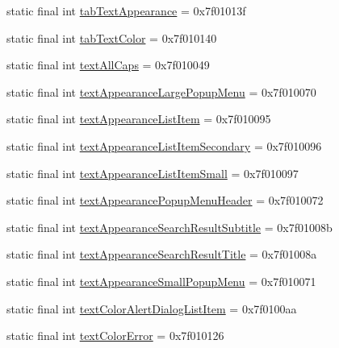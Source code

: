 \begin{CompactItemize}
\item 
static final int \hyperlink{classandroid_1_1support_1_1coreutils_1_1_r_1_1attr_c15cf96834741bc42b41baaee0ecf40f}{tabTextAppearance} = 0x7f01013f
\item 
static final int \hyperlink{classandroid_1_1support_1_1coreutils_1_1_r_1_1attr_e9d3c152066389e8ec541049ad937762}{tabTextColor} = 0x7f010140
\item 
static final int \hyperlink{classandroid_1_1support_1_1coreutils_1_1_r_1_1attr_b7b1c8a0c971e6901b2221500092f4fc}{textAllCaps} = 0x7f010049
\item 
static final int \hyperlink{classandroid_1_1support_1_1coreutils_1_1_r_1_1attr_e0037c83ef07e0b93a2fadab5cb1f950}{textAppearanceLargePopupMenu} = 0x7f010070
\item 
static final int \hyperlink{classandroid_1_1support_1_1coreutils_1_1_r_1_1attr_ad1107b3e7e49f66905d300eafcbb47b}{textAppearanceListItem} = 0x7f010095
\item 
static final int \hyperlink{classandroid_1_1support_1_1coreutils_1_1_r_1_1attr_c2f04fb74c8792d73022935e83b62a57}{textAppearanceListItemSecondary} = 0x7f010096
\item 
static final int \hyperlink{classandroid_1_1support_1_1coreutils_1_1_r_1_1attr_13828f83a04e4eef190a9d7f09523194}{textAppearanceListItemSmall} = 0x7f010097
\item 
static final int \hyperlink{classandroid_1_1support_1_1coreutils_1_1_r_1_1attr_453dfd9c527becd2d4d5d71c92fd1997}{textAppearancePopupMenuHeader} = 0x7f010072
\item 
static final int \hyperlink{classandroid_1_1support_1_1coreutils_1_1_r_1_1attr_dd92587e1790df831aa81efe9cac7042}{textAppearanceSearchResultSubtitle} = 0x7f01008b
\item 
static final int \hyperlink{classandroid_1_1support_1_1coreutils_1_1_r_1_1attr_f8b8bc98235454f72f5c3c0c41fdabc6}{textAppearanceSearchResultTitle} = 0x7f01008a
\item 
static final int \hyperlink{classandroid_1_1support_1_1coreutils_1_1_r_1_1attr_b4a699bec30848bfb8ea27008e4ac839}{textAppearanceSmallPopupMenu} = 0x7f010071
\item 
static final int \hyperlink{classandroid_1_1support_1_1coreutils_1_1_r_1_1attr_7240028895c63d9e1342770f7647ec4f}{textColorAlertDialogListItem} = 0x7f0100aa
\item 
static final int \hyperlink{classandroid_1_1support_1_1coreutils_1_1_r_1_1attr_b7012049ce26d860067749d2616fbb8f}{textColorError} = 0x7f010126
\item 

\end{CompactItemize}
